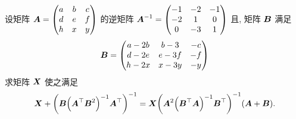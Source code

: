 \begin{example}[2016 浙江大学]
    设矩阵 $\vb*{A}=\begin{pmatrix}
            a & b & c \\
            d & e & f \\
            h & x & y
        \end{pmatrix}$ 的逆矩阵 $\vb*{A}^{-1}=\begin{pmatrix}
            -1 & -2 & -1 \\
            -2 & 1  & 0  \\
            0  & -3 & 1
        \end{pmatrix}$ 且, 矩阵 $\vb*{B}$ 满足 $$\vb*{B}=\begin{pmatrix}
            a-2b & b-3  & -c \\
            d-2e & e-3f & -f \\
            h-2x & x-3y & -y
        \end{pmatrix}$$ 求矩阵 $\vb*{X}$ 使之满足
    $$\vb*{X}+\qty(\vb*{B}\qty(\vb*{A}^{\top}\vb*{B}^2)^{-1}\vb*{A}^{\top})^{-1}=\vb*{X}\qty(\vb*{A}^2\qty(\vb*{B}^{\top}\vb*{A})^{-1}\vb*{B}^{\top})^{-1}(\vb*{A}+\vb*{B}).$$
\end{example}
